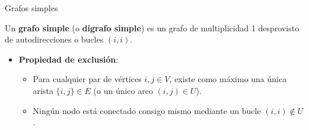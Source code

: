 \documentclass[
  ignorenonframetext,
]{beamer}
\providecommand{\tightlist}{%
  \setlength{\itemsep}{0pt}\setlength{\parskip}{0pt}}
\begin{document}
\begin{frame}{Grafos simples}
\label{grafos-simples}
\begin{tcolorbox}[enhanced jigsaw, left=2mm, opacityback=0, titlerule=0mm, breakable, toptitle=1mm, rightrule=.15mm, bottomtitle=1mm, coltitle=black, title=\textcolor{quarto-callout-note-color}{\faInfo}\hspace{0.5em}{Definición: Grafo simple}, colframe=quarto-callout-note-color-frame, colbacktitle=quarto-callout-note-color!10!white, arc=.35mm, toprule=.15mm, leftrule=.75mm, bottomrule=.15mm, opacitybacktitle=0.6, colback=white]

Un \textbf{grafo simple} (o \textbf{digrafo simple}) es un grafo de
multiplicidad 1 desprovisto de autodirecciones o bucles \((i, i)\).

\begin{itemize}
\tightlist
\item
  \textbf{Propiedad de exclusión}:

  \begin{itemize}
  \tightlist
  \item
    Para cualquier par de vértices \(i, j \in V\), existe como máximo
    una única arista \(\{i, j\} \in E\) (o un único arco
    \((i, j) \in U\)).
  \item
    Ningún nodo está conectado consigo mismo mediante un bucle
    \((i, i) \notin U\).
  \end{itemize}
\end{itemize}

\end{tcolorbox}
\end{frame}
\end{document}
